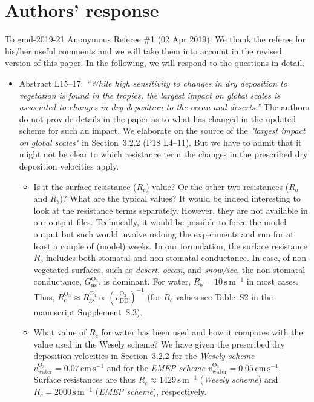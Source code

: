 \documentclass{scrartcl}
\begin{document}
\section*{Authors' response}
To gmd-2019-21 Anonymous Referee \#1 (02 Apr 2019):
We thank the referee for his/her useful comments and we will take them into account in the revised version of this paper.
In the following, we will respond to the questions in detail.
\begin{itemize}
\item {\color{blue}  Abstract L15--17: \emph{“While high sensitivity to changes in dry deposition to
    vegetation is found in the tropics, the largest impact on global scales is associated to
    changes in dry deposition to the ocean and deserts.”} The authors do not provide details
  in the paper as to what has changed in the updated scheme for such an impact.}
  We elaborate on the source of the \emph{"largest impact on global scales"} in Section~3.2.2 (P18 L4--11). But we have to admit that it might not be clear to which resistance term the changes in the prescribed dry deposition velocities apply. 
  \begin{itemize}
  \item {\color{blue} Is it the surface resistance ($R_c$) value? Or the other two resistances ($R_a$ and $R_b$)? What are the typical values?}
    It would be indeed interesting to look at the resistance terms separately. However, they are not available in our output files.
    Technically, it would be possible to force the model output but such would involve redoing the experiments and run for at least a couple of (model) weeks. In our formulation, the surface resistance $R_c$ includes both stomatal and non-stomatal conductance. In case, of non-vegetated surfaces, such as \emph{desert}, \emph{ocean}, and \emph{snow/ice}, the non-stomatal conductance, $G_\mathrm{ns}^\mathrm{O_3}$, is dominant. For water, $R_b = 10\,\mathrm{s\,m^{-1}}$ in most cases. Thus, $R_c^\mathrm{O_3} \approx R_\mathrm{gs}^\mathrm{O_3} \propto (v_\mathrm{DD}^\mathrm{O_3})^{-1}$ (for $R_c$ values see Table~S2 in the manuscript Supplement~S.3).
  \item {\color{blue} What value of $R_c$ for water has been used and how it compares with the value used in the Wesely scheme?}
    We have given the prescribed dry deposition velocities in Section~3.2.2 for the \emph{Wesely scheme}
    $v_\mathrm{water}^\mathrm{O_3} = 0.07\,\mathrm{cm\,s^{-1}}$ and for the \emph{EMEP scheme}
    $v_\mathrm{water}^\mathrm{O_3} = 0.05\,\mathrm{cm\,s^{-1}}$. Surface resistances are thus $R_c \approx 1429\,\mathrm{s\,m^{-1}}$ (\emph{Wesely scheme}) and $R_c = 2000\,\mathrm{s\,m^{-1}}$ (\emph{EMEP scheme}), respectively.
  \end{itemize}


\end{itemize}
\end{document}
